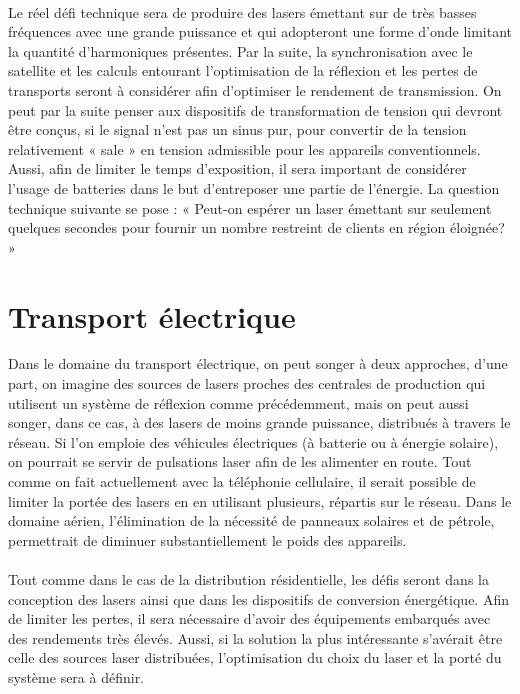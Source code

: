 \paragraph{} Le réel défi technique sera de produire des lasers émettant sur de très basses fréquences avec une grande puissance et qui adopteront une forme d’onde limitant la quantité d’harmoniques présentes. Par la suite, la synchronisation avec le satellite et les calculs entourant l’optimisation de la réflexion et les pertes de transports seront à considérer afin d’optimiser le rendement de transmission. On peut par la suite penser aux dispositifs de transformation de tension qui devront être conçus, si le signal n’est pas un sinus pur, pour convertir de la tension relativement « sale » en tension admissible pour les appareils conventionnels. Aussi, afin de limiter le temps d’exposition, il sera important de considérer l’usage de batteries dans le but d’entreposer une partie de l’énergie. La question technique suivante se pose : « Peut-on espérer un laser émettant sur seulement quelques secondes pour fournir un nombre restreint de clients en région éloignée? » 
\section{Transport électrique}
Dans le domaine du transport électrique, on peut songer à deux approches, d'une part, on imagine des sources de lasers proches des centrales de production qui utilisent un système de réflexion comme précédemment, mais on peut aussi songer, dans ce cas, à des lasers de moins grande puissance, distribués à travers le réseau. Si l'on emploie des véhicules électriques (à batterie ou à énergie solaire), on pourrait se servir de pulsations laser afin de les alimenter en route. Tout comme on fait actuellement avec la téléphonie cellulaire, il serait possible de limiter la portée des lasers en en utilisant plusieurs, répartis sur le réseau. Dans le domaine aérien, l'élimination de la nécessité de panneaux solaires et de pétrole, permettrait de diminuer substantiellement le poids des appareils. 

\paragraph{} Tout comme dans le cas de la distribution résidentielle, les défis seront dans la conception des lasers ainsi que dans les dispositifs de conversion énergétique. Afin de limiter les pertes, il sera nécessaire d'avoir des équipements embarqués avec des rendements très élevés. Aussi, si la solution la plus intéressante s'avérait être celle des sources laser distribuées, l'optimisation du choix du laser et la porté du système sera à définir. 
